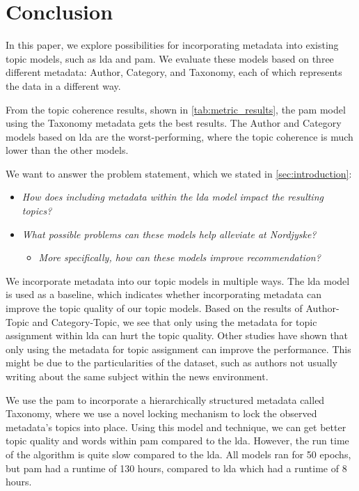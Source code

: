 \section{Conclusion}\label{sec:conclusion}
In this paper, we explore possibilities for incorporating metadata into existing topic models, such as \gls{lda} and \gls{pam}.
We evaluate these models based on three different metadata: Author, Category, and Taxonomy, each of which represents the data in a different way.

From the topic coherence results, shown in \autoref{tab:metric_results}, the \gls{pam} model using the Taxonomy metadata gets the best results.
The Author and Category models based on \gls{lda} are the worst-performing, where the topic coherence is much lower than the other models.

We want to answer the problem statement, which we stated in \autoref{sec:introduction}:


\begin{itemize}
	\item \textit{How does including metadata within the \gls{lda} model impact the resulting topics?}
	\item \textit{What possible problems can these models help alleviate at Nordjyske?}
	\begin{itemize}
		\item \textit{More specifically, how can these models improve recommendation?}
	\end{itemize}
\end{itemize}

We incorporate metadata into our topic models in multiple ways.
The \gls{lda} model is used as a baseline, which indicates whether incorporating metadata can improve the topic quality of our topic models.
Based on the results of Author-Topic and Category-Topic, we see that only using the metadata for topic assignment within \gls{lda} can hurt the topic quality.
Other studies have shown that only using the metadata for topic assignment can improve the performance.
This might be due to the particularities of the dataset, such as authors not usually writing about the same subject within the news environment.  


We use the \gls{pam} to incorporate a hierarchically structured metadata called Taxonomy, where we use a novel locking mechanism to lock the observed metadata's topics into place.
Using this model and technique, we can get better topic quality and words within \gls{pam} compared to the \gls{lda}.
However, the run time of the algorithm is quite slow compared to the \gls{lda}.
All models ran for 50 epochs, but \gls{pam} had a runtime of 130 hours, compared to \gls{lda} which had a runtime of 8 hours.

